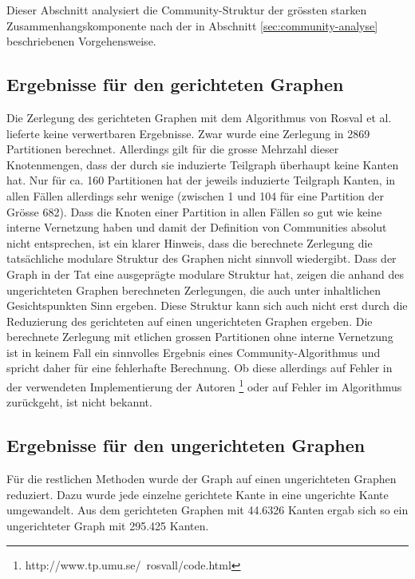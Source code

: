 Dieser Abschnitt analysiert die Community-Struktur der gr\"ossten
starken Zusammenhangskomponente nach der in Abschnitt
\ref{sec:community-analyse} beschriebenen Vorgehensweise.

\subsection{Ergebnisse f\"ur den gerichteten Graphen}
\label{sec:ergebnisse-fur-den}

Die Zerlegung des gerichteten Graphen mit dem Algorithmus von Rosval
et al. lieferte keine verwertbaren Ergebnisse. Zwar wurde eine
Zerlegung in 2869 Partitionen berechnet. Allerdings gilt f\"ur die
grosse Mehrzahl dieser Knotenmengen, dass der durch sie induzierte
Teilgraph \"uberhaupt keine Kanten hat. Nur f\"ur ca. 160 Partitionen
hat der jeweils induzierte Teilgraph Kanten, in allen F\"allen
allerdings sehr wenige (zwischen 1 und 104 f\"ur eine Partition der
Gr\"osse 682). Dass die Knoten einer Partition in allen F\"allen so
gut wie keine interne Vernetzung haben und damit der Definition von
Communities absolut nicht entsprechen, ist ein klarer Hinweis, dass
die berechnete Zerlegung die tats\"achliche modulare Struktur des
Graphen nicht sinnvoll wiedergibt. Dass der Graph in der Tat eine
ausgepr\"agte modulare Struktur hat, zeigen die anhand des
ungerichteten Graphen berechneten Zerlegungen, die auch unter
inhaltlichen Gesichtspunkten Sinn ergeben. Diese Struktur kann sich
auch nicht erst durch die Reduzierung des gerichteten auf einen
ungerichteten Graphen ergeben. Die berechnete Zerlegung mit etlichen
grossen Partitionen ohne interne Vernetzung ist in keinem Fall ein
sinnvolles Ergebnis eines Community-Algorithmus und spricht daher
f\"ur eine fehlerhafte Berechnung. Ob diese allerdings auf Fehler in
der verwendeten Implementierung der Autoren
\footnote{http://www.tp.umu.se/~rosvall/code.html} oder auf Fehler im
Algorithmus zur\"uckgeht, ist nicht bekannt.

\subsection{Ergebnisse f\"ur den ungerichteten Graphen}
\label{sec:ergebnisse-fur-den-1}

F\"ur die restlichen Methoden wurde der Graph auf einen ungerichteten
Graphen reduziert. Dazu wurde jede einzelne gerichtete Kante in eine
ungerichte Kante umgewandelt. Aus dem gerichteten Graphen mit 44.6326
Kanten ergab sich so ein ungerichteter Graph mit 295.425 Kanten.

